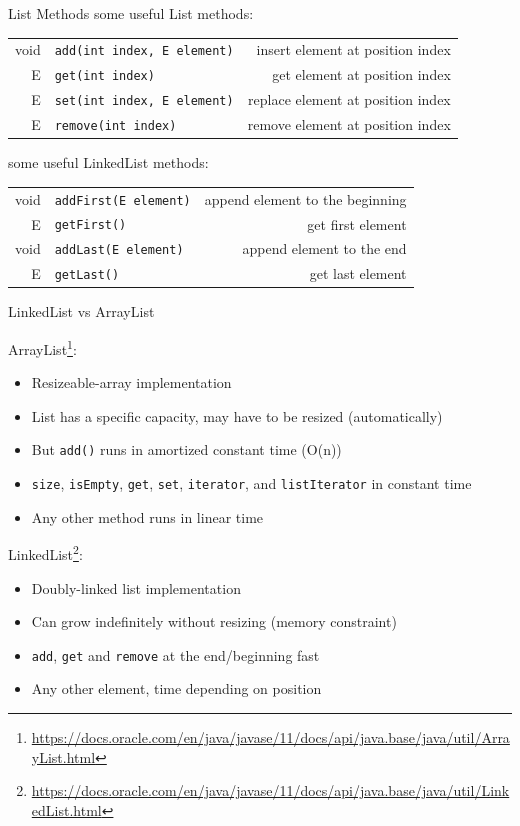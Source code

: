 \begin{frame}[fragile]{List Methods}
	some useful List methods:\\
	\vspace{1em}
	\begin{tabular}{ r l r }
		void & \texttt{add(int index, E element)}
		& \footnotesize{insert element at position index} \\
		E &\texttt{get(int index)}
		& \footnotesize{get element at position index} \\
		E &\texttt{set(int index, E element)}
		& \footnotesize{replace element at position index} \\
		E &\texttt{remove(int index)}
		& \footnotesize{remove element at position index}
	\end{tabular}
	\vfill
	some useful LinkedList methods:\\
	\vspace{1em}
	\begin{tabular}{ r l r }
		void & \texttt{addFirst(E element)}
		& \footnotesize{append element to the beginning} \\
		E & \texttt{getFirst()}
		& \footnotesize{get first element} \\
		void & \texttt{addLast(E element)}
		& \footnotesize{append element to the end} \\
		E & \texttt{getLast()}
		& \footnotesize{get last element}
	\end{tabular}
\end{frame}

\begin{frame}[allowframebreaks]{LinkedList vs ArrayList}
	
	ArrayList\footnote{ \url{https://docs.oracle.com/en/java/javase/11/docs/api/java.base/java/util/ArrayList.html}}:
	\begin{itemize}
		\item Resizeable-array implementation
		\item List has a specific capacity, may have to be resized (automatically)
		\item But \texttt{add()} runs in amortized constant time (O(n))
		\item \texttt{size}, \texttt{isEmpty}, \texttt{get}, \texttt{set}, \texttt{iterator}, and \texttt{listIterator} in constant time
		\item Any other method runs in linear time
	\end{itemize}

	\framebreak
	LinkedList\footnote{\url{https://docs.oracle.com/en/java/javase/11/docs/api/java.base/java/util/LinkedList.html}}:
	\begin{itemize}
		\item Doubly-linked list implementation
		\item Can grow indefinitely without resizing (memory constraint)
		\item \texttt{add}, \texttt{get} and \texttt{remove} at the end/beginning fast
		\item Any other element, time depending on position
	\end{itemize}
	 

\end{frame}

